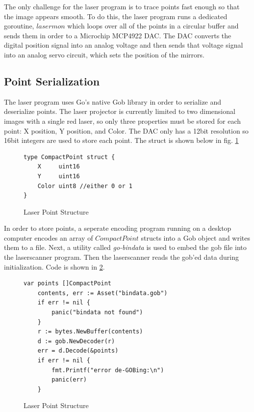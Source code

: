 The only challenge for the laser program is to trace points fast enough so that the image appears smooth.
To do this, the laser program runs a dedicated goroutine, $lasermon$ which loops over all of the points
in a circular buffer and sends them in order to a Microchip MCP4922 DAC. The
DAC converts the digital position signal into an analog voltage and then
sends that voltage signal into an analog servo circuit, which sets the position
of the mirrors.

\subsection{Point Serialization}
The laser program uses Go's native Gob library in order to serialize and
deserialize points. The laser projector is currently limited to
two dimensional images with a single red laser, so only three
properties must be stored for each point: X position, Y position,
and Color. The DAC only has a 12bit resolution so 16bit integers are used
to store each point. The struct is shown below in fig. \ref{fig:cpoint}

\begin{figure}[!h]
\begin{center}
\begin{lstlisting}
type CompactPoint struct {
	X     uint16
	Y     uint16
	Color uint8 //either 0 or 1
}
\end{lstlisting}
\end{center}
  \caption{Laser Point Structure} \label{fig:cpoint}
\end{figure}

In order to store points, a seperate encoding program running
on a desktop computer encodes an array of $CompactPoint$ structs into
a Gob object and writes them to a file. Next, a utility called
\textit{go-bindata} is used to embed the gob file into the laserscanner
program. Then the laserscanner reads the gob'ed data during initialization.
Code is shown in \ref{fig:loadpoints}.

\begin{figure}[h]
\begin{center}
\begin{lstlisting}
var points []CompactPoint
	contents, err := Asset("bindata.gob")
	if err != nil {
		panic("bindata not found")
	}
	r := bytes.NewBuffer(contents)
	d := gob.NewDecoder(r)
	err = d.Decode(&points)
	if err != nil {
		fmt.Printf("error de-GOBing:\n")
		panic(err)
	}
\end{lstlisting}
\end{center}
  \caption{Laser Point Structure} \label{fig:loadpoints}
\end{figure}

